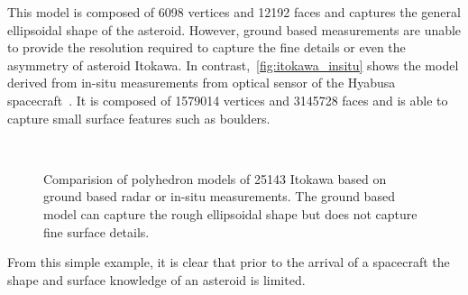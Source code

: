 This model is composed of \num{6098} vertices and \num{12192} faces and captures the general ellipsoidal shape of the asteroid.
However, ground based measurements are unable to provide the resolution required to capture the fine details or even the asymmetry of asteroid Itokawa.
In contrast,~\cref{fig:itokawa_insitu} shows the model derived from in-situ measurements from optical sensor of the Hyabusa spacecraft~\cite{gaskell2008a}.
It is composed of \num{1579014} vertices and \num{3145728} faces and is able to capture small surface features such as boulders.
\begin{figure}
    \centering
    ~
    \caption[Comparison of Radar and In-situ Itokawa models]{Comparision of polyhedron models of 25143 Itokawa based on ground based radar or in-situ measurements.
        The ground based model can capture the rough ellipsoidal shape but does not capture fine surface details.}
\end{figure}
From this simple example, it is clear that prior to the arrival of a spacecraft the shape and surface knowledge of an asteroid is limited.

